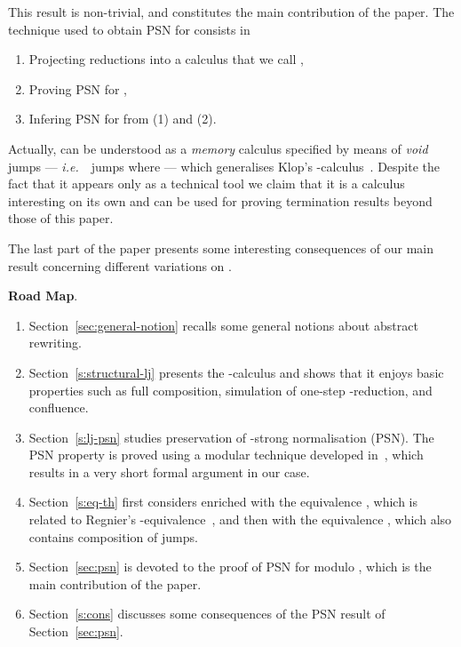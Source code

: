 \documentclass{LMCS}
\newcommand{\ie}{{\it  i.e.}~}
\renewcommand{\>}{\rightarrow}
\newcommand{\deft}[1]{{\bf #1}}
\begin{document}
This result is non-trivial, and constitutes the main contribution of the paper.
The technique used to obtain PSN for  consists in
\begin{enumerate}
\item Projecting  reductions into a calculus that we call ,
\item Proving PSN for ,
\item Infering PSN for  from (1) and (2).
\end{enumerate}
Actually,  can be understood as a \textit{memory}
calculus specified by means of \textit{void} jumps --- \ie\ jumps  where  --- 
which generalises Klop's -calculus~\cite{Klo}. 
Despite 
the fact that it  appears only
as a technical tool we claim that 
it is a calculus interesting
on its own and can be used for proving termination
results beyond those of this paper.

The last part of the paper presents some interesting consequences of
our main result concerning different variations on
.  \medskip

\deft{Road Map}.

\begin{enumerate}[]
\item Section~\ref{sec:general-notion} recalls some general 
notions about abstract rewriting.

\item Section~\ref{s:structural-lj} presents the -calculus and 
  shows  that  it   enjoys  basic properties such as full composition,
  simulation   of   one-step
  -reduction, and confluence.

\item Section~\ref{s:lj-psn} studies    preservation of 
-strong normalisation (PSN). The     PSN    property is proved   using     a   modular  
  technique developed in~\cite{Kes09}, which  results in a
  very short  formal argument in our  case. 
 
\item Section~\ref{s:eq-th} first considers  
  enriched with the 
  equivalence , which is related to Regnier's
  -equivalence~\cite{regnier94},  and 
then with the equivalence , which also contains composition of
  jumps.

\item Section~\ref{sec:psn} is devoted to the proof of PSN for  modulo ,
which  is the main  contribution of the  paper.

\item Section~\ref{s:cons} discusses some consequences of the PSN result of
  Section~\ref{sec:psn}.
\end{enumerate}
\end{document}
